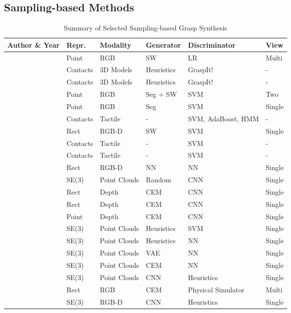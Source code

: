 \documentclass[letterpaper,10pt]{article}
\begin{document}
\subsection{Sampling-based Methods}
\label{sec:sample-grasp}

\begin{table}[t]
\caption{Summary of Selected Sampling-based Grasp Synthesis}
\label{table:sampling-grasp}
\begin{center}
\begin{tabularx}{1\columnwidth}{m{4cm}m{1.3cm}<{\centering}m{2cm}<{\centering}m{2cm}<{\centering}m{2.7cm}<{\centering}m{1.6cm}<{\centering}}
\toprule
 \bf Author \& \bf Year & \bf Repr. & \bf Modality & \bf Generator & \bf Discriminator & \bf View\\
\midrule

\cite{saxena2006robotic} & Point & RGB & SW & LR & Multi \\
\cite{goldfeder2007grasp} & Contacts & 3D Models & Heuristics & GraspIt! & - \\
\cite{huebner2008minimum} & Contacts & 3D Models & Heuristics & GraspIt! & - \\
\cite{bohg2009grasping} & Point & RGB & Seg + SW & SVM & Two\\
\cite{rao2010grasping} & Point & RGB & Seg & SVM & Single \\
\cite{bekiroglu2011assessing} & Contacts & Tactile & - & SVM, AdaBoost, HMM & - \\
\cite{jiang2011efficient} & Rect & RGB-D & SW & SVM & Single\\
\cite{dang2012learning} & Contacts & Tactile & - & SVM & -\\
\cite{schill2012learning} & Contacts & Tactile & - & SVM & -\\
\cite{lenz2015deep} & Rect & RGB-D & NN & NN & Single \\
\cite{gualtieri2016high} & SE(3) & Point Clouds & Random & CNN & Single\\
\cite{mahler2017dex} & Rect & Depth & CEM & CNN & Single \\
\cite{mahler2017learning} & Rect & Depth & CEM & CNN & Single\\
\cite{mahler2018dex} & Point & Depth & CEM & CNN & Single \\
\cite{ten2018using} & SE(3) & Point Clouds & Heuristics & SVM & Single\\
\cite{liang2019pointnetgpd} & SE(3) & Point Clouds & Heuristics & NN & Single\\
\cite{mousavian20196} & SE(3) & Point Clouds & VAE & NN & Single\\
\cite{yan2019data} & SE(3) & Point Clouds & CEM & NN & Single\\
\cite{li2020learning} & SE(3) & Point Clouds & CNN & Heuristics & Single \\
\cite{chen2021ab} & Rect & RGB & CEM & Physical Simulator & Multi \\
\cite{gou2021rgb} & SE(3) & RGB-D & CNN & Heuristics & Single \\


\end{tabularx}
\end{center}
\end{table}
\end{document}
